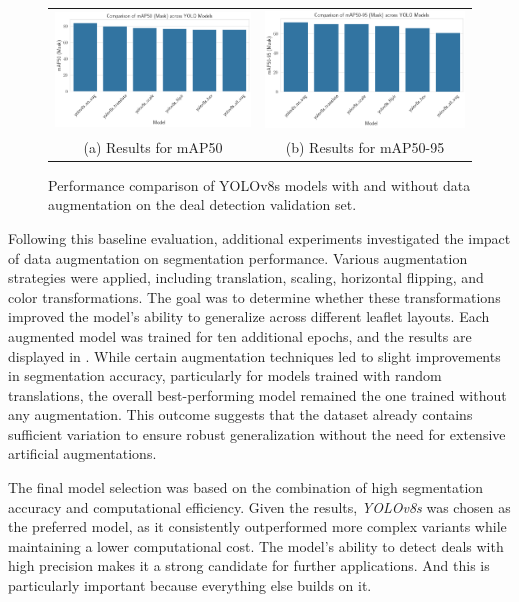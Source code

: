 \documentclass[11pt]{article}
\begin{document}
\begin{figure}[h!]
    \centering
    \begin{tabular}{cc}
    \includegraphics[width=0.5\linewidth]{figures/deal_detection/map50_yolo8.png} &   \includegraphics[width=0.5\linewidth]{figures/deal_detection/map50_95_yolo8.png} \\
    (a) Results for mAP50 & (b) Results for mAP50-95 \\[2pt]
    \end{tabular}
    \caption{Performance comparison of YOLOv8s models with and without data augmentation on the deal detection validation set.}
    \label{fig:yolo8_results}
\end{figure}

Following this baseline evaluation, additional experiments investigated the impact of data augmentation on segmentation performance. Various augmentation strategies were applied, including translation, scaling, horizontal flipping, and color transformations. The goal was to determine whether these transformations improved the model’s ability to generalize across different leaflet layouts. Each augmented model was trained for ten additional epochs, and the results are displayed in . While certain augmentation techniques led to slight improvements in segmentation accuracy, particularly for models trained with random translations, the overall best-performing model remained the one trained without any augmentation. This outcome suggests that the dataset already contains sufficient variation to ensure robust generalization without the need for extensive artificial augmentations.

The final model selection was based on the combination of high segmentation accuracy and computational efficiency. Given the results, \emph{YOLOv8s} was chosen as the preferred model, as it consistently outperformed more complex variants while maintaining a lower computational cost. The model’s ability to detect deals with high precision makes it a strong candidate for further applications. And this is particularly important because everything else builds on it.
\end{document}
